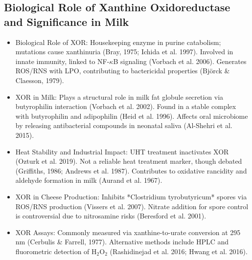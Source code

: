 \subsection*{Biological Role of Xanthine Oxidoreductase and Significance in Milk}
\begin{itemize}
    \item Biological Role of XOR:
    \subitem Housekeeping enzyme in purine catabolism; mutations cause xanthinuria (Bray, 1975; Ichida et al. 1997).
    \subitem Involved in innate immunity, linked to NF-$\kappa$B signaling (Vorbach et al. 2006).
    \subitem Generates ROS/RNS with LPO, contributing to bactericidal properties (Björck \& Claesson, 1979).

    \item XOR in Milk:
    \subitem Plays a structural role in milk fat globule secretion via butyrophilin interaction (Vorbach et al. 2002).
    \subitem Found in a stable complex with butyrophilin and adipophilin (Heid et al. 1996).
    \subitem Affects oral microbiome by releasing antibacterial compounds in neonatal saliva (Al-Shehri et al. 2015).

    \item Heat Stability and Industrial Impact:
    \subitem UHT treatment inactivates XOR (Ozturk et al. 2019).
    \subitem Not a reliable heat treatment marker, though debated (Griffiths, 1986; Andrews et al. 1987).
    \subitem Contributes to oxidative rancidity and aldehyde formation in milk (Aurand et al. 1967).

    \item XOR in Cheese Production:
    \subitem Inhibits *Clostridium tyrobutyricum* spores via ROS/RNS production (Vissers et al. 2007).
    \subitem Nitrate addition for spore control is controversial due to nitrosamine risks (Beresford et al. 2001).

    \item XOR Assays:
    \subitem Commonly measured via xanthine-to-urate conversion at 295 nm (Cerbulis \& Farrell, 1977).
    \subitem Alternative methods include HPLC and fluorometric detection of H$_2$O$_2$ (Rashidinejad et al. 2016; Hwang et al. 2016).
\end{itemize}
 

